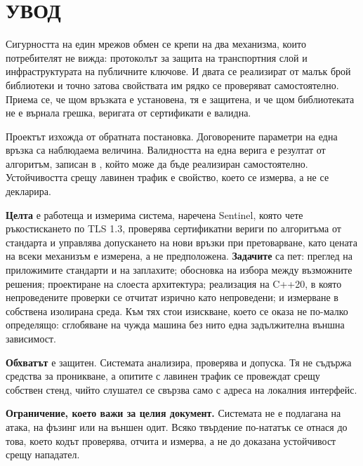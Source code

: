 \section*{УВОД}
\label{sec:introduction}

Сигурността на един мрежов обмен се крепи на два механизма, които потребителят не вижда:
протоколът за защита на транспортния слой и инфраструктурата на публичните ключове. И двата се
реализират от малък брой библиотеки и точно затова свойствата им рядко се проверяват
самостоятелно. Приема се, че щом връзката е установена, тя е защитена, и че щом библиотеката не
е върнала грешка, веригата от сертификати е валидна.

Проектът изхожда от обратната постановка. Договорените параметри на една връзка са наблюдаема
величина. Валидността на една верига е резултат от алгоритъм, записан в \cite{rfc5280}, който
може да бъде реализиран самостоятелно. Устойчивостта срещу лавинен трафик е свойство, което се
измерва, а не се декларира.

\textbf{Целта} е работеща и измерима система, наречена Sentinel, която чете ръкостискането по
TLS 1.3, проверява сертификатни вериги по алгоритъма от стандарта и управлява допускането на
нови връзки при претоварване, като цената на всеки механизъм е измерена, а не предположена.
\textbf{Задачите} са пет: преглед на приложимите стандарти и на заплахите; обосновка на избора
между възможните решения; проектиране на слоеста архитектура; реализация на C++20, в която
непроведените проверки се отчитат изрично като непроведени; и измерване в собствена изолирана
среда. Към тях стои изискване, което се оказа не по-малко определящо: сглобяване на чужда машина
без нито една задължителна външна зависимост.

\textbf{Обхватът} е защитен. Системата анализира, проверява и допуска. Тя не съдържа средства за
проникване, а опитите с лавинен трафик се провеждат срещу собствен стенд, чийто слушател се
свързва само с адреса на локалния интерфейс.

\textbf{Ограничение, което важи за целия документ.} Системата не е подлагана на атака, на фъзинг
или на външен одит. Всяко твърдение по-нататък се отнася до това, което кодът проверява, отчита
и измерва, а не до доказана устойчивост срещу нападател.
